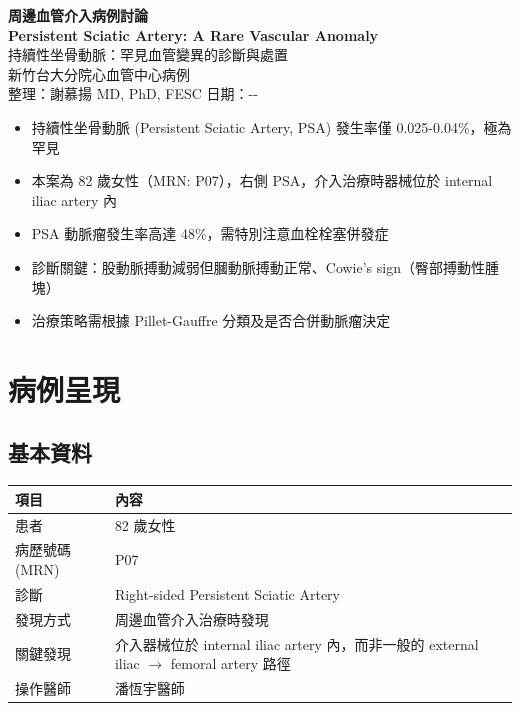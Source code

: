 \documentclass[12pt,a4paper]{article}
\newcommand{\keyfinding}[1]{
    \par
    \noindent
    \begin{tcolorbox}[
        colback=yellow!10!white,
        colframe=orange!75!black,
        title=\textbf{核心發現摘要},
        fonttitle=\bfseries,
        boxrule=0.5pt,
        arc=3pt
    ]
    #1
    \end{tcolorbox}
}
\newcommand{\mydate}{\the\year-\the\month-\the\day}
\begin{document}
\begin{center}
{\LARGE\bfseries\textcolor{emergency_red}{周邊血管介入病例討論}}\\[0.5cm]
{\Large\textbf{Persistent Sciatic Artery: A Rare Vascular Anomaly}}\\[0.3cm]
{\large 持續性坐骨動脈：罕見血管變異的診斷與處置}\\[0.5cm]
{\normalsize 新竹台大分院心血管中心病例}\\[0.3cm]
{\normalsize 整理：謝慕揚 MD, PhD, FESC \quad 日期：\mydate}
\end{center}

\vspace{0.5cm}

\keyfinding{
\begin{itemize}[leftmargin=*]
    \item 持續性坐骨動脈 (Persistent Sciatic Artery, PSA) 發生率僅 0.025-0.04\%，極為罕見
    \item 本案為 82 歲女性（MRN: P07），右側 PSA，介入治療時器械位於 internal iliac artery 內
    \item PSA 動脈瘤發生率高達 48\%，需特別注意血栓栓塞併發症
    \item 診斷關鍵：股動脈搏動減弱但膕動脈搏動正常、Cowie's sign（臀部搏動性腫塊）
    \item 治療策略需根據 Pillet-Gauffre 分類及是否合併動脈瘤決定
\end{itemize}
}

\section{病例呈現}

\subsection{基本資料}

\begin{longtable}{p{4cm}p{10cm}}
\toprule
\textbf{項目} & \textbf{內容} \\
\midrule
\endfirsthead
\bottomrule
\endlastfoot
患者 & 82 歲女性 \\
\midrule
病歷號碼 (MRN) & P07 \\
\midrule
診斷 & Right-sided Persistent Sciatic Artery \\
\midrule
發現方式 & 周邊血管介入治療時發現 \\
\midrule
關鍵發現 & 介入器械位於 internal iliac artery 內，而非一般的 external iliac $\rightarrow$ femoral artery 路徑 \\
\midrule
操作醫師 & 潘恆宇醫師 \\
\end{longtable}
\end{document}
